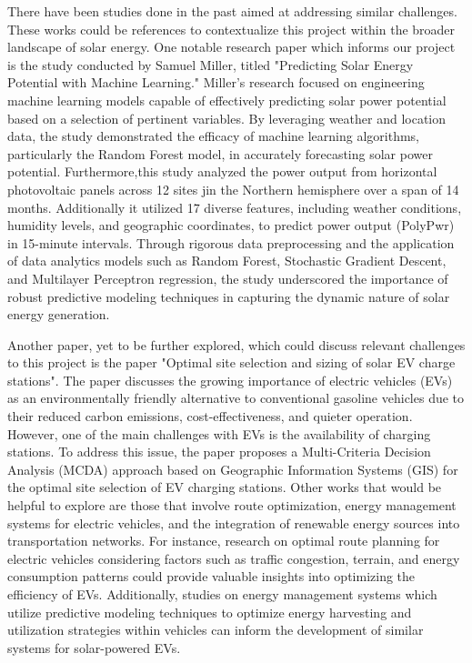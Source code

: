 \documentclass[10pt,twocolumn]{article}
\begin{document}
There have been studies done in the past aimed at addressing similar challenges. These works could be references to contextualize this project within the broader landscape of solar energy.  
One notable research paper which informs our project is the study conducted by Samuel Miller, titled "Predicting Solar Energy Potential with Machine Learning." Miller's research focused on engineering machine learning models capable of effectively predicting solar power potential based on a selection of pertinent variables. By leveraging weather and location data, the study demonstrated the efficacy of machine learning algorithms, particularly the Random Forest model, in accurately forecasting solar power potential. Furthermore,this study analyzed the power output from horizontal photovoltaic panels across 12 sites jin the Northern hemisphere over a span of 14 months. Additionally it utilized 17 diverse features, including weather conditions, humidity levels, and geographic coordinates, to predict power output (PolyPwr) in 15-minute intervals. Through rigorous data preprocessing and the application of data analytics models such as Random Forest, Stochastic Gradient Descent, and Multilayer Perceptron regression, the study underscored the importance of robust predictive modeling techniques in capturing the dynamic nature of solar energy generation.

Another paper, yet to be further explored, which could discuss relevant challenges to this project is the paper "Optimal site selection and sizing of solar EV charge stations". The paper discusses the growing importance of electric vehicles (EVs) as an environmentally friendly alternative to conventional gasoline vehicles due to their reduced carbon emissions, cost-effectiveness, and quieter operation. However, one of the main challenges with EVs is the availability of charging stations. To address this issue, the paper proposes a Multi-Criteria Decision Analysis (MCDA) approach based on Geographic Information Systems (GIS) for the optimal site selection of EV charging stations.
Other works that would be helpful to explore are those that involve route optimization, energy management systems for electric vehicles, and the integration of renewable energy sources into transportation networks. For instance, research on optimal route planning for electric vehicles considering factors such as traffic congestion, terrain, and energy consumption patterns could provide valuable insights into optimizing the efficiency of EVs. Additionally, studies on energy management systems which utilize predictive modeling techniques to optimize energy harvesting and utilization strategies within vehicles can inform the development of similar systems for solar-powered EVs.
\end{document}
